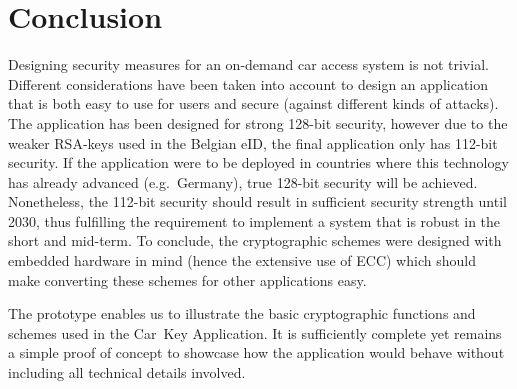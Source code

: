 \section{Conclusion}

Designing security measures for an on-demand car access system is not trivial. Different considerations have been taken into account to design an application that is both easy to use for users and secure (against different kinds of attacks). The application has been designed for strong 128-bit security, however due to the weaker RSA-keys used in the Belgian eID, the final application only has 112-bit security. If the application were to be deployed in countries where this technology has already advanced (e.g.\ Germany), true 128-bit security will be achieved. Nonetheless, the 112-bit security should result in sufficient security strength until 2030, thus fulfilling the requirement to implement a system that is robust in the short and mid-term. To conclude, the cryptographic schemes were designed with embedded hardware in mind (hence the extensive use of ECC) which should make converting these schemes for other applications easy.

The prototype enables us to illustrate the basic cryptographic functions and schemes used in the Car~Key Application. It is sufficiently complete yet remains a simple proof of concept to showcase how the application would behave without including all technical details involved.
